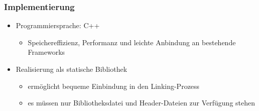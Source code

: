 \mode*

\begin{frame}
  \frametitle{Implementierung}
  \onslide<+->
  \begin{itemize}
    \item<+-> Programmiersprache: C++
      \begin{itemize}
        \item<+-> Speichereffizienz, Performanz und leichte Anbindung an bestehende Frameworks
      \end{itemize}
    \item<+-> Realisierung als statische Bibliothek
      \begin{itemize}
        \item<+-> erm\"oglicht bequeme Einbindung in den Linking-Prozess
        \item<+-> es m\"ussen nur Bibliotheksdatei und Header-Dateien zur Verf\"ugung stehen
      \end{itemize}
  \end{itemize}
\end{frame}

